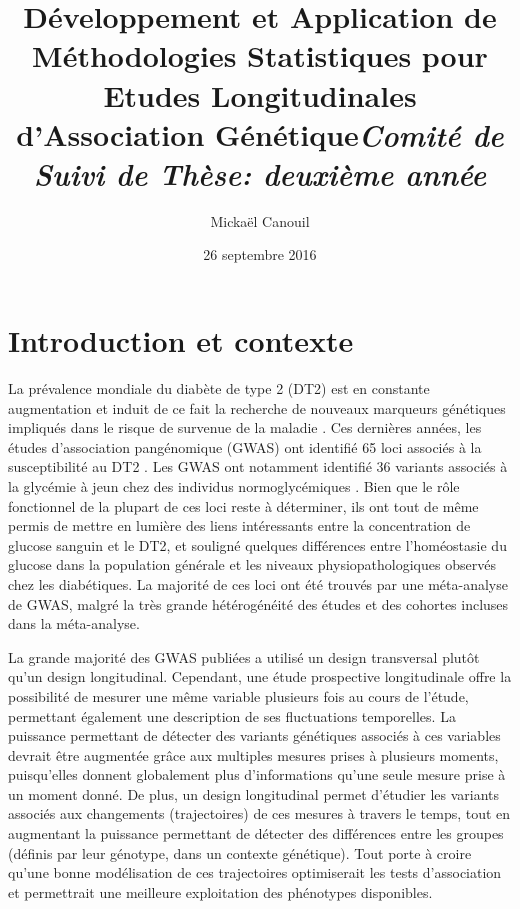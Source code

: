 \documentclass[11pt, a4paper]{article}
\title{\huge{Développement et Application de Méthodologies Statistiques pour Etudes Longitudinales d'Association Génétique}\linebreak \large{\textit{Comité de Suivi de Thèse: deuxième année}}}
\date{26 septembre 2016}
\author{Mickaël Canouil}
\institute{\cmdb{G}énomique \cmdb{I}ntégrative et \cmdb{M}odélisation des \cmdb{M}aladies \cmdb{M}étaboliques \linebreak UMR 8199 (CNRS / Université de Lille 2 / Institut Pasteur de Lille)}
\begin{document}
\maketitle
\tableofcontents

\clearpage
\section{Introduction et contexte}
\par{La prévalence mondiale du diabète de type 2 (DT2) est en constante augmentation et induit de ce fait la recherche de nouveaux marqueurs génétiques impliqués dans le risque de survenue de la maladie \citep{world_health_organization_diabetes_2015}.
Ces dernières années, les études d’association pangénomique (GWAS) ont identifié 65 loci associés à la susceptibilité au DT2 \citep{morris_large-scale_2012}.
Les GWAS ont notamment identifié 36 variants associés à la glycémie à jeun chez des individus normoglycémiques \citep{dupuis_new_2010, scott_large-scale_2012}.
Bien que le rôle fonctionnel de la plupart de ces loci reste à déterminer, ils ont tout de même permis de mettre en lumière des liens intéressants entre la concentration de glucose sanguin et le DT2,
et souligné quelques différences entre l’homéostasie du glucose dans la population générale et les niveaux physiopathologiques observés chez les diabétiques.
La majorité de ces loci ont été trouvés par une  méta-analyse de GWAS, malgré la très grande hétérogénéité des études et des cohortes incluses dans la méta-analyse.}

\par{La grande majorité des GWAS publiées a utilisé un design transversal plutôt qu’un design longitudinal.
Cependant, une étude prospective longitudinale offre la possibilité de mesurer une même variable plusieurs fois au cours de l’étude, permettant également une description de ses fluctuations temporelles.
La  puissance permettant de détecter des variants génétiques associés à ces variables devrait être augmentée grâce aux multiples mesures prises à plusieurs moments,
puisqu’elles donnent globalement plus d’informations qu’une seule mesure prise à un moment donné.
De plus, un design longitudinal permet d’étudier les variants associés aux changements (trajectoires) de ces mesures à travers le temps,
tout en augmentant la puissance permettant  de détecter des différences entre les groupes (définis par leur génotype, dans un contexte génétique).
Tout porte à croire qu’une bonne modélisation de ces trajectoires optimiserait les tests d’association et permettrait une meilleure exploitation des phénotypes disponibles.}
\end{document}
